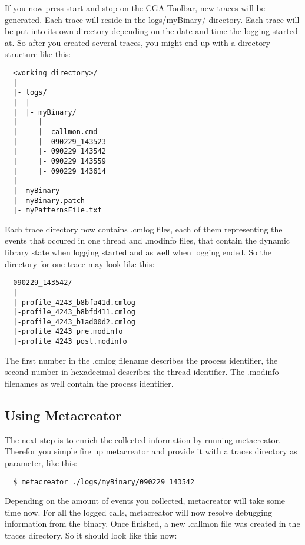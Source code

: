 If you now press start and stop on the CGA Toolbar, new traces will be generated. Each trace will reside in the logs/myBinary/ directory. Each trace will be put into its own directory depending on the date and time the logging started at. So after you created several traces, you might end up with a directory structure like this:   

\begin{verbatim}
  <working directory>/
  |
  |- logs/
  |  |
  |  |- myBinary/
  |     |
  |     |- callmon.cmd
  |     |- 090229_143523
  |     |- 090229_143542
  |     |- 090229_143559
  |     |- 090229_143614
  |
  |- myBinary
  |- myBinary.patch
  |- myPatternsFile.txt
\end{verbatim}

Each trace directory now contains .cmlog files, each of them representing the events that occured in one thread and .modinfo files, that contain the dynamic library state when logging started and as well when logging ended. So the directory for one trace may look like this: 

\begin{verbatim}
  090229_143542/
  |
  |-profile_4243_b8bfa41d.cmlog
  |-profile_4243_b8bfd411.cmlog
  |-profile_4243_b1ad00d2.cmlog
  |-profile_4243_pre.modinfo
  |-profile_4243_post.modinfo
\end{verbatim}

The first number in the .cmlog filename describes the process identifier, the second number in hexadecimal describes the thread identifier. The .modinfo filenames as well contain the process identifier.

\subsection{Using Metacreator} The next step is to enrich the collected information by running metacreator. Therefor you simple fire up metacreator and provide it with a traces directory as parameter, like this:

\begin{verbatim}
  $ metacreator ./logs/myBinary/090229_143542
\end{verbatim}

Depending on the amount of events you collected, metacreator will take some time now. For all the logged calls, metacreator will now resolve debugging information from the binary. Once finished, a new .callmon file was created in the traces directory. So it should look like this now:

